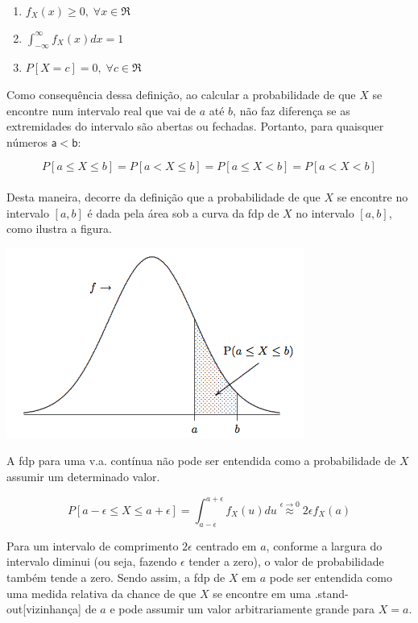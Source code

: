 \documentclass[
]{book}
\providecommand{\tightlist}{%
  \setlength{\itemsep}{0pt}\setlength{\parskip}{0pt}}
\theoremstyle{definition}
\theoremstyle{definition}
\theoremstyle{definition}
\theoremstyle{remark}
\begin{document}
\begin{enumerate}
\def\labelenumi{\arabic{enumi}.}
\tightlist
\item
  \({f_X(x) \geq 0, \; \forall x \in \Re}\)\\
\item
  \({\int_{-\infty}^{\infty} f_X(x) dx= 1}\)\\
\item
  \({P[X=c] =0, \; \forall c \in \Re}\)
\end{enumerate}

Como consequência dessa definição, ao calcular a probabilidade de que \(X\) se encontre num intervalo real que vai de \(a\) até \(b\), não faz diferença se as extremidades do intervalo são abertas ou fechadas. Portanto, para quaisquer números \(\mathsf{a < b}\):

\[{P[a \leq X \leq b] = P[a < X \leq b] = P[a \leq X < b] = P[a < X < b]}\]\\
Desta maneira, decorre da definição que a probabilidade de que \(X\) se encontre no intervalo \([a,b]\) é dada pela área sob a curva da fdp de \(X\) no intervalo \([a,b]\), como ilustra a figura.

\includegraphics[width=0.6\linewidth]{img/fdp-cont}

A fdp para uma v.a. contínua não pode ser entendida como a probabilidade de \(X\) assumir um determinado valor.

\[P[a - \epsilon \leq X \leq a+ \epsilon] = \int_{a-\epsilon}^{a+\epsilon} f_X(u) du \stackrel{\epsilon \rightarrow 0}{\approx} 2 \epsilon f_X(a)\]

Para um intervalo de comprimento \(2\epsilon\) centrado em \(a\), conforme a largura do intervalo diminui (ou seja, fazendo \(\epsilon\) tender a zero), o valor de probabilidade também tende a zero. Sendo assim, a fdp de \(X\) em \(a\) pode ser entendida como uma medida relativa da chance de que \(X\) se encontre em uma .stand-out{[}vizinhança{]} de \(a\) e pode assumir um valor arbitrariamente grande para \(X=a\).
\end{document}
